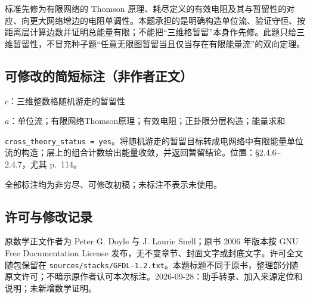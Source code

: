 \documentclass[UTF8,11pt]{ctexart}
\theoremstyle{definition}
\begin{document}
标准先修为有限网络的 Thomson 原理、耗尽定义的有效电阻及其与暂留性的对应、向更大网络增边的电阻单调性。本题承担的是明确构造单位流、验证守恒、按距离层计算边数并证明总能量有限；不能把“三维格暂留”本身作先修。此题只给三维暂留性，不冒充种子题“任意无限图暂留当且仅当存在有限能量流”的双向定理。
\subsection*{可修改的简短标注（非作者正文）}
$c$：三维整数格随机游走的暂留性

$a$：单位流；有限网络Thomson原理；有效电阻；正卦限分层构造；能量求和

\texttt{cross\_theory\_status = yes}。将随机游走的暂留目标转成电网络中有限能量单位流的构造；层上的组合计数给出能量收敛，并返回暂留结论。位置：\S2.4.6--2.4.7，尤其 p.~114。

全部标注均为非穷尽、可修改初稿；未标注不表示未使用。
\subsection*{许可与修改记录}
原数学正文作者为 Peter G. Doyle 与 J. Laurie Snell；原书 2006 年版本按 GNU Free Documentation License 发布，无不变章节、封面文字或封底文字。许可全文随包保留在 \texttt{sources/stacks/GFDL-1.2.txt}。本题标题不同于原书，整理部分随原文许可；不暗示原作者认可本次标注。2026-09-28：助手转录、加入来源定位和说明；未新增数学证明。
\end{document}
